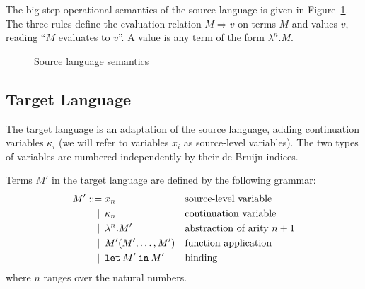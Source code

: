 \documentclass[a4paper,11pt]{article}
\begin{document}
The big-step operational semantics of the source language is given in
Figure~\ref{fig:sourcesemantics}. The three rules define the evaluation relation
$M \Rightarrow v$ on terms $M$ and values $v$, reading ``$M$ evaluates to $v$''.
A value is any term of the form $\lambda^{n}.M$.

\begin{figure}
\caption{Source language semantics}
\label{fig:sourcesemantics}
\end{figure}

\subsection{Target Language}

The target language is an adaptation of the source language, adding
continuation variables $\kappa_{i}$ (we will refer to variables $x_{i}$
as source-level variables). The two types of variables are numbered
independently by their de Bruijn indices.

Terms $M'$ in the target language are defined by the following grammar:
\begin{align*}
M' ::=            &\; x_{n}
                  && \text{source-level variable} \\
\llap{\textbar\:} &\; \kappa_{n}
                  && \text{continuation variable} \\
\llap{\textbar\:} &\; \lambda^{n}.M'
                  && \text{abstraction of arity $n+1$} \\
\llap{\textbar\:} &\; M'(M', \ldots, M')
                  && \text{function application} \\
\llap{\textbar\:} &\; \texttt{let} \: M' \: \texttt{in} \: M'
                  && \text{binding}
\end{align*}
where $n$ ranges over the natural numbers.
\end{document}
